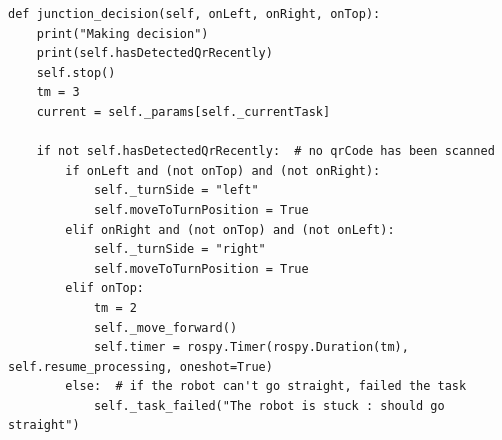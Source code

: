 \documentclass[a4paper,12pt]{extreport}
\begin{document}
\begin{verbatim}
def junction_decision(self, onLeft, onRight, onTop):
    print("Making decision")
    print(self.hasDetectedQrRecently)
    self.stop()
    tm = 3
    current = self._params[self._currentTask]
        
    if not self.hasDetectedQrRecently:  # no qrCode has been scanned
        if onLeft and (not onTop) and (not onRight): 
            self._turnSide = "left"
            self.moveToTurnPosition = True
        elif onRight and (not onTop) and (not onLeft): 
            self._turnSide = "right"
            self.moveToTurnPosition = True
        elif onTop: 
            tm = 2
            self._move_forward()        
            self.timer = rospy.Timer(rospy.Duration(tm), self.resume_processing, oneshot=True)
        else:  # if the robot can't go straight, failed the task
            self._task_failed("The robot is stuck : should go straight")
   

\end{verbatim}
\end{document}
